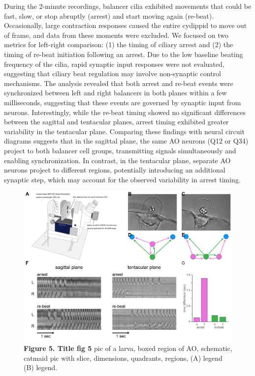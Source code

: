 \documentclass[
  11pt,
]{article}
\begin{document}
During the 2-minute recordings, balancer cilia exhibited movements that
could be fast, slow, or stop abruptly (arrest) and start moving again
(re-beat). Occasionally, large contraction responses caused the entire
cydippid to move out of frame, and data from these moments were
excluded. We focused on two metrics for left-right comparison: (1) the
timing of ciliary arrest and (2) the timing of re-beat initiation
following an arrest. Due to the low baseline beating frequency of the
cilia, rapid synaptic input responses were not evaluated, suggesting
that ciliary beat regulation may involve non-synaptic control
mechanisms. The analysis revealed that both arrest and re-beat events
were synchronized between left and right balancers in both planes within
a few milliseconds, suggesting that these events are governed by
synaptic input from neurons. Interestingly, while the re-beat timing
showed no significant differences between the sagittal and tentacular
planes, arrest timing exhibited greater variability in the tentacular
plane. Comparing these findings with neural circuit diagrams suggests
that in the sagittal plane, the same AO neurons (Q12 or Q34) project to
both balancer cell groups, transmitting signals simultaneously and
enabling synchronization. In contrast, in the tentacular plane, separate
AO neurons project to different regions, potentially introducing an
additional synaptic step, which may account for the observed variability
in arrest timing.

\begin{figure}[H]

{\centering \includegraphics[width=1\textwidth,height=\textheight]{figures/Figure5.png}

}

\caption{\textbf{Figure 5. Title fig 5} pic of a larva, boxed region of
AO, schematic, catmaid pic with slice, dimensions, quadrants, regions,
(A) legend (B) legend.}

\end{figure}%
\end{document}
